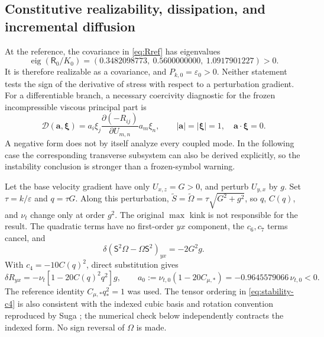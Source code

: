 \documentclass[11pt,a4paper]{article}
\numberwithin{equation}{section}
\newcommand{\eps}{\varepsilon}
\newcommand{\qs}{q_*}
\newcommand{\Cs}{C_{\mu,*}}
\newcommand{\R}{\mathsf{R}}
\newcommand{\Sm}{\mathsf{S}}
\newcommand{\Om}{\mathsf{\Omega}}
\begin{document}
\subsection{Constitutive realizability, dissipation, and incremental diffusion}
At the reference, the covariance in \cref{eq:Rref} has eigenvalues
\begin{equation}
 \operatorname{eig}(\R_0/K_0)
 =(0.3482098773,\ 0.5600000000,\ 1.0917901227)>0.
 \label{eq:stability-realizable}
\end{equation}
It is therefore realizable as a covariance, and
$P_{k,0}=\eps_0>0$. Neither statement tests the sign of the derivative
of stress with respect to a perturbation gradient.
For a differentiable branch, a necessary coercivity diagnostic for
the frozen incompressible viscous principal part is
\begin{equation}
 \mathcal D(\bm a,\bm\xi)
 =a_i\xi_j\frac{\partial(-R_{ij})}{\partial U_{m,n}}
      a_m\xi_n,
 \qquad |\bm a|=|\bm\xi|=1,\quad \bm a\cdot\bm\xi=0.
 \label{eq:stability-symbol}
\end{equation}
A negative form does not by itself analyze every coupled mode. In the
following case the corresponding transverse subsystem can also be
derived explicitly, so the instability conclusion is stronger than
a frozen-symbol warning.

Let the base velocity gradient have only $U_{x,z}=G>0$, and perturb
$U_{y,x}$ by $g$. Set $\tau=k/\eps$ and
$q=\tau G$. Along this perturbation,
$\widetilde S=\widetilde\Omega=\tau\sqrt{G^2+g^2}$, so $q$,
$C(q)$, and $\nu_t$ change only at order $g^2$. The original
$\max$ kink is not responsible for the result. The quadratic terms
have no first-order $yx$ component, the $c_6,c_7$ terms cancel, and
\begin{equation}
 \delta(\Sm^2\Om-\Om\Sm^2)_{yx}=-2G^2g.
 \label{eq:stability-c4}
\end{equation}
With $c_4=-10C(q)^2$, direct substitution gives
\begin{equation}
 \delta R_{yx}
 =-\nu_t[1-20C(q)^2q^2]g,
 \qquad
 \boxed{a_0:=\nu_{t,0}(1-20\Cs)
       =-0.9645579066\,\nu_{t,0}<0.}
 \label{eq:stability-negative-diffusion}
\end{equation}
The reference identity $\Cs\qs^2=1$ was used. The tensor ordering in
\cref{eq:stability-c4} is also consistent with the indexed cubic
basis and rotation convention reproduced by Suga
\cite[Eq.~(30)]{Suga1998}; the numerical check below independently
contracts the indexed form. No sign reversal of $\Omega$ is made.
\end{document}

